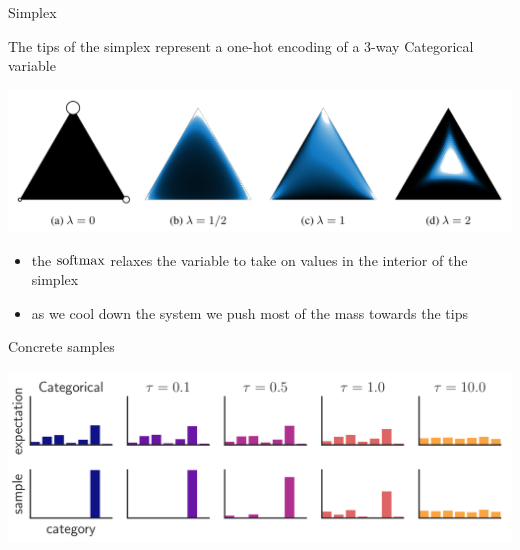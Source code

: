 \begin{frame}{Simplex}

The tips of the simplex represent a one-hot encoding of a 3-way Categorical variable

\begin{center}
\includegraphics[scale=0.25]{img/simplex}
\end{center}

\begin{itemize}
	\item the $\operatorname{softmax}$ relaxes the variable to take on values in the interior of the simplex
	\item as we cool down the system we push most of the mass towards the tips
\end{itemize}


\end{frame}


\begin{frame}{Concrete samples}

\begin{center}
\includegraphics[scale=0.25]{img/bars}
\end{center}



\end{frame}


